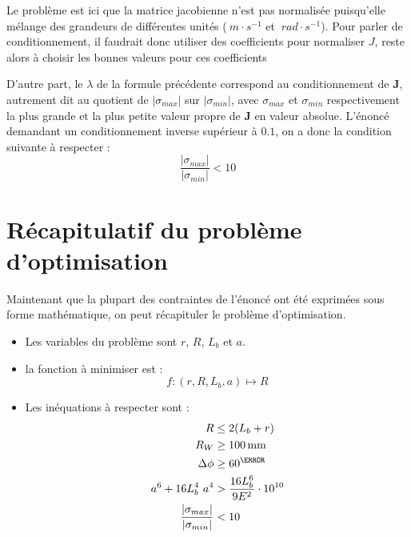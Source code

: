\documentclass{article}
\begin{document}
\begin{multicols*}{2}
Le problème est ici que la matrice jacobienne n'est pas normalisée puisqu'elle mélange des grandeurs de différentes unités ($\SI{}{m\cdot s^{-1}}$ et $\SI{}{rad \cdot s^{-1}}$). Pour parler de conditionnement, il faudrait donc utiliser des coefficients pour normaliser $J$, reste alors à choisir les bonnes valeurs pour ces coefficients

D'autre part, le $\lambda$ de la formule précédente correspond au conditionnement de $\mathbf{J}$, autrement dit au quotient de $|\sigma_{max}|$ sur $|\sigma_{min}|$, avec $\sigma_{max}$ et $\sigma_{min}$ respectivement la plus grande et la plus petite valeur propre de $\mathbf{J}$ en valeur absolue. L'énoncé demandant un conditionnement inverse supérieur à $0.1$, on a donc la condition suivante à respecter : 
\begin{equation}
    \frac{|\sigma_{max}|}{|\sigma_{min}|}<10
\end{equation}

\section*{Récapitulatif du problème d'optimisation}

Maintenant que la plupart des contraintes de l'énoncé ont été exprimées sous forme mathématique, on peut récapituler le problème d'optimisation.

\begin{itemize}
    \item Les variables du problème sont $r$, $R$, $L_b$ et $a$.
    \item la fonction à minimiser est :
    \begin{equation}
        f \colon (r,R,L_b,a) \mapsto R
    \end{equation}
    \item Les inéquations à respecter sont :
    \begin{equation}
    \begin{aligned}
        R &\leq 2(L_b+r)\\
        R_W &\geq \SI{100}{mm}\\
        \Delta \phi &\geq 60^\degree\\
        a^6 + 16 L_b^4 \ a^4 & > \frac{16 L_b^6}{9 E^2} \cdot 10^{10}\\
        \frac{|\sigma_{max}|}{|\sigma_{min}|} & <10
    \end{aligned}  
    \label{ineqs}
    \end{equation}
\end{itemize}


\end{multicols*}
\end{document}

